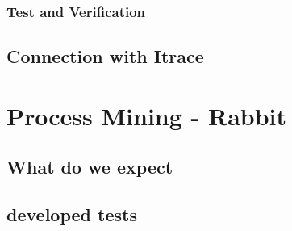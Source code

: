 	\subsubsection{Test and Verification}

\subsection{Connection with Itrace}


\section{Process Mining - Rabbit}
	\subsection{What do we expect}
	\subsection{developed tests}
	